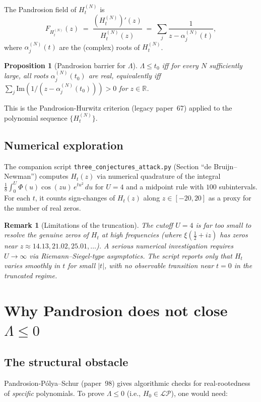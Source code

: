 \documentclass[11pt,a4paper]{article}
\newtheorem{proposition}[theorem]{Proposition}
\newtheorem{remark}[theorem]{Remark}
\begin{document}
The Pandrosion field of $H_t^{(N)}$ is
\[
F_{H_t^{(N)}}(z) \;=\; \frac{(H_t^{(N)})'(z)}{H_t^{(N)}(z)} \;=\;
\sum_{j} \frac{1}{z - \alpha_j^{(N)}(t)},
\]
where $\alpha_j^{(N)}(t)$ are the (complex) roots of $H_t^{(N)}$.

\begin{proposition}[Pandrosion barrier for $\Lambda$]\label{prop:barrier}
$\Lambda \le t_0$ iff for every $N$ sufficiently large, all roots
$\alpha_j^{(N)}(t_0)$ are real, equivalently iff
$\sum_j \mathrm{Im}(1/(z - \alpha_j^{(N)}(t_0))) > 0$ for $z \in \mathbb{R}$.
\end{proposition}

This is the Pandrosion-Hurwitz criterion (legacy paper~67) applied to
the polynomial sequence $\{H_t^{(N)}\}$.

\subsection{Numerical exploration}

The companion script \texttt{three\_conjectures\_attack.py} (Section ``de Bruijn--Newman'')
computes $H_t(z)$ via numerical quadrature of the integral
$\frac{1}{8} \int_0^U \Phi(u) \cos(zu)\, e^{tu^2}\, du$ for $U = 4$ and a
midpoint rule with $100$ subintervals. For each $t$, it counts sign-changes
of $H_t(z)$ along $z \in [-20, 20]$ as a proxy for the number of real zeros.

\begin{remark}[Limitations of the truncation]
The cutoff $U = 4$ is far too small to resolve the genuine zeros of
$H_t$ at high frequencies (where $\xi(\tfrac{1}{2} + iz)$ has zeros
near $z \approx 14.13, 21.02, 25.01, \ldots$). A serious numerical
investigation requires $U \to \infty$ via Riemann--Siegel-type
asymptotics. The script reports only that $H_t$ varies smoothly in $t$
for small $|t|$, with no observable transition near $t = 0$ in the
truncated regime.
\end{remark}

\section{Why Pandrosion does not close $\Lambda \le 0$}\label{sec:why-not}

\subsection{The structural obstacle}

Pandrosion-P\'olya--Schur (paper~98) gives algorithmic checks for
real-rootedness of \emph{specific} polynomials. To prove $\Lambda \le 0$
(i.e., $H_0 \in \mathcal{LP}$), one would need:
\end{document}

